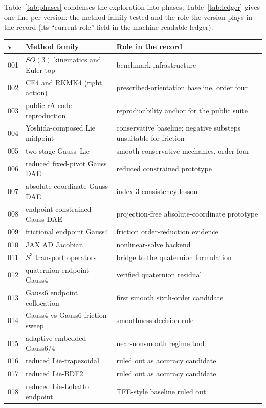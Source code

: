 Table~\ref{tab:phases} condenses the exploration into phases; Table~\ref{tab:ledger} gives one line per version: the method family tested and the role the
version plays in the record (its ``current role'' field in the machine-readable ledger).

\begin{table}[t]
\centering
\scriptsize\setlength{\tabcolsep}{3pt}
\begin{tabular}[t]{@{}p{}p{}p{}@{}}
\toprule
v & Method family & Role in the record \\
\midrule
001 & $SO(3)$ kinematics and Euler top & benchmark infrastructure \\
002 & CF4 and RKMK4 (right action) & prescribed-orientation baseline, order four \\
003 & public rA code reproduction & reproducibility anchor for the public suite \\
004 & Yoshida-composed Lie midpoint & conservative baseline; negative substeps unsuitable for friction \\
005 & two-stage Gauss--Lie & smooth conservative mechanics, order four \\
006 & reduced fixed-pivot Gauss DAE & reduced constrained prototype \\
007 & absolute-coordinate Gauss DAE & index-3 consistency lesson \\
008 & endpoint-constrained Gauss DAE & projection-free absolute-coordinate prototype \\
009 & frictional endpoint Gauss4 & friction order-reduction evidence \\
010 & JAX AD Jacobian & nonlinear-solve backend \\
011 & $S^3$ transport operators & bridge to the quaternion formulation \\
012 & quaternion endpoint Gauss4 & verified quaternion residual \\
013 & Gauss6 endpoint collocation & first smooth sixth-order candidate \\
014 & Gauss4 vs Gauss6 friction sweep & smoothness decision rule \\
015 & adaptive embedded Gauss6/4 & near-nonsmooth regime tool \\
016 & reduced Lie-trapezoidal & ruled out as accuracy candidate \\
017 & reduced Lie-BDF2 & ruled out as accuracy candidate \\
018 & reduced Lie-Lobatto endpoint & TFE-style baseline ruled out \\

\end{tabular}
\end{table}

